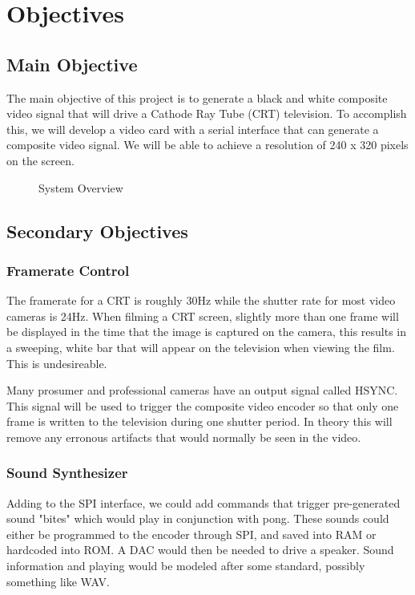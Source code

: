 \section{Objectives}

\subsection{Main Objective}

The main objective of this project is to generate a black and white composite
video signal that will drive a Cathode Ray Tube (CRT) television. To accomplish
this, we will develop a video card with a serial interface that can generate a
composite video signal. We will be able to achieve a resolution of 240 x 320
pixels on the screen.

\begin{figure}[H]
   \centering
   \caption{System Overview}
\end{figure}

\subsection{Secondary Objectives}

\subsubsection{Framerate Control}

The framerate for a CRT is roughly 30Hz while the shutter rate for most video
cameras is 24Hz. When filming a CRT screen, slightly more than one frame will be
displayed in the time that the image is captured on the camera, this results in
a sweeping, white bar that will appear on the television when viewing the film.
This is undesireable.

Many prosumer and professional cameras have an output signal called HSYNC. This
signal will be used to trigger the composite video encoder so that only one
frame is written to the television during one shutter period. In theory this
will remove any erronous artifacts that would normally be seen in the video.

\subsubsection{Sound Synthesizer}

Adding to the SPI interface, we could add commands that trigger pre-generated
sound "bites" which would play in conjunction with pong. These sounds could
either be programmed to the encoder through SPI, and saved into RAM or hardcoded
into ROM. A DAC would then be needed to drive a speaker. Sound information and
playing would be modeled after some standard, possibly something like WAV.

